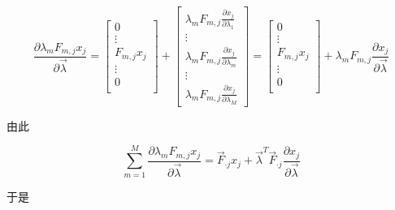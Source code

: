 \begin{equation}
    \frac{\partial \lambda_mF_{m,j}x_j}{\partial\vec{\lambda}} = \left[
        \begin{aligned}
            0          \\
            \vdots     \\
            F_{m,j}x_j \\
            \vdots     \\
            0          \\
        \end{aligned}
        \right] + \left[
        \begin{aligned}
            \lambda_mF_{m,j}\frac{\partial x_j}{\partial \lambda_1} \\
            \vdots                                                  \\
            \lambda_mF_{m,j}\frac{\partial x_j}{\partial \lambda_m} \\
            \vdots                                                  \\
            \lambda_mF_{m,j}\frac{\partial x_j}{\partial \lambda_M}
        \end{aligned}
        \right] = \left[
        \begin{aligned}
            0          \\
            \vdots     \\
            F_{m,j}x_j \\
            \vdots     \\
            0          \\
        \end{aligned}
        \right] + \lambda_mF_{m,j}\frac{\partial x_j}{\partial \vec{\lambda}}
\end{equation}

由此

\begin{equation}
    \sum_{m=1}^M \frac{\partial \lambda_mF_{m,j}x_j}{\partial\vec{\lambda}} = \vec{F}_{\cdot j}x_j + \vec{\lambda}^T\vec{F}_{\cdot j}\frac{\partial x_j}{\partial \vec{\lambda}}
\end{equation}

于是

